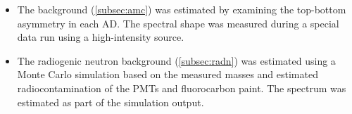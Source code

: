 \begin{itemize}
        examining events occurring shortly following muon signals
        in the outer water shield (OWS), assumed to be fast neutrons.
        The assumption was validated by comparing the OWS-tagged spectrum
        to the nominal IBD-like spectrum at energies between \SIlist{12;100}{\MeV}.
        Normalizing the OWS-tagged spectrum to the nominal spectrum
        yields the number of background events within \SIrange{1.5}{12}{\MeV}.
        Uncertainties were determined by comparing the OWS-tagged spectrum
        below \SI{12}{\MeV} to a function which was fit to the IBD-like spectrum
        above \SI{12}{\MeV} and extrapolated to the energy range of interest.
    \item The \amc{} background (\cref{subsec:amc}) was estimated by
        examining the top-bottom asymmetry in each AD.
        The spectral shape was measured during a special data run
        using a high-intensity \amc{} source.
    \item The radiogenic neutron background (\cref{subsec:radn})
        was estimated using a Monte Carlo simulation
        based on the measured masses and estimated
        radiocontamination of the PMTs and fluorocarbon paint.
        The spectrum was estimated as part of the simulation output.
\end{itemize}
